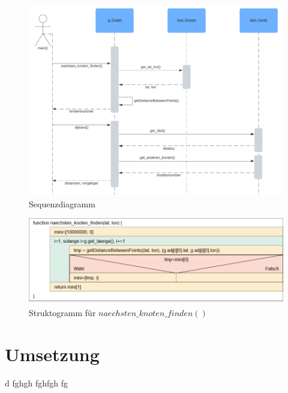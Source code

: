 \documentclass[a4paper,10pt,ngerman]{scrartcl}
\begin{document}
\begin{figure}[!ht]
  \center
  \includegraphics[width=\textwidth]{Sequenzdiagramm.png}
  \vspace{-.5cm}
  \caption{Sequenzdiagramm}
\end{figure}

\begin{figure}[!ht]
  \center
  \includegraphics[width=\textwidth]{Struktogramm.png}
  \vspace{-1cm}
  \caption{Struktogramm für $naechsten\_knoten\_finden()$}
\end{figure}

\newpage
\section{Umsetzung}
d fghgh fghfgh fg
\end{document}
